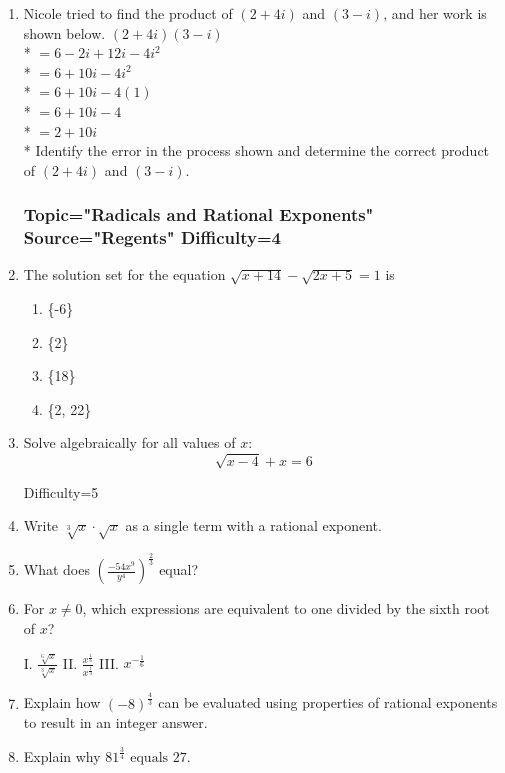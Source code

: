 \documentclass[12pt, oneside]{article}
\begin{document}
\begin{enumerate}
\item Nicole tried to find the product of $(2+ 4i)$ and $(3 - i)$, and her work is shown below.
$(2 + 4i)(3 - i)$\\*
$=6 - 2i + 12i - 4i^2$\\*
$=6 + 10i - 4i^2$\\*
$=6 + 10i - 4(1)$\\*
$=6 + 10i - 4$\\*
$=2 + 10i$\\*
Identify the error in the process shown and determine the correct product of $(2+ 4i)$ and $(3 - i)$.%

\subsubsection*{Topic="Radicals and Rational Exponents"\\
Source="Regents" 
Difficulty=4}

\item The solution set for the equation $\sqrt{x+14}- \sqrt{2x+5}= 1$ is
\begin{enumerate}
    \item \{-6\}
    \item \{2\}
    \item \{18\}
    \item \{2, 22\}
\end{enumerate} %

\item Solve algebraically for all values of $x$: 
\[\sqrt{x-4}+x=6\] %


Difficulty=5
\item Write $\sqrt[3]x \cdot \sqrt{x}$ as a single term with a rational exponent. %

\item What does $\displaystyle \left( \frac{-54x^9}{y^4} \right)^\frac{2}{3}$ equal? %

\item For $x \neq 0$, which expressions are equivalent to one divided by the sixth root of $x$?
\begin{center}
    I. $\frac{\sqrt[6]{x}}{\sqrt[3]{x}}$ \qquad  II. $\displaystyle \frac{x^\frac{1}{6}}{x^\frac{1}{3}}$  \qquad  III. $x^{-\frac{1}{6}}$
\end{center}


\item Explain how $\displaystyle (-8)^\frac{4}{3}$ can be evaluated using properties of rational exponents to result in an integer answer.
\item Explain why $81^\frac{3}{4} \text{ equals } 27$.


\end{enumerate}
\end{document}
